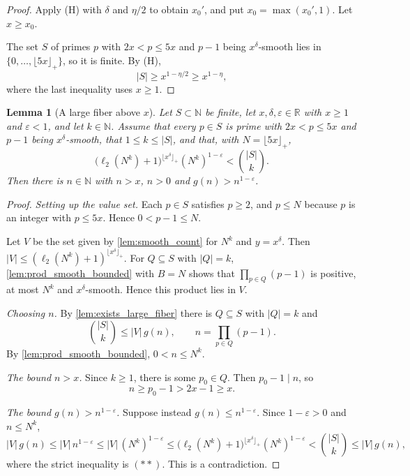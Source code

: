 \documentclass[11pt]{article}
\newtheorem{lemma}[theorem]{Lemma}
\theoremstyle{definition}
\theoremstyle{remark}
\newcommand{\floorp}[1]{\lfloor #1\rfloor_{+}}
\newcommand{\ltwo}{\ell_{2}}
\begin{document}
\begin{proof}
Apply (H) with $\delta$ and $\eta/2$ to obtain $x_0'$, and put $x_0=\max(x_0',1)$. Let $x\ge x_0$.

The set $S$ of primes $p$ with $2x<p\le5x$ and $p-1$ being $x^\delta$-smooth lies in $\{0,\dots,\floorp{5x}\}$, so it is finite. By (H),
\[
|S|\ge x^{1-\eta/2}\ge x^{1-\eta},
\]
where the last inequality uses $x\ge1$.
\end{proof}

\begin{lemma}[A large fiber above $x$]\label{lem:good_n_from_finset}
Let $S\subset\mathbb{N}$ be finite, let $x,\delta,\varepsilon\in\mathbb{R}$ with $x\ge1$ and $\varepsilon<1$, and let $k\in\mathbb{N}$. Assume that every $p\in S$ is prime with $2x<p\le5x$ and $p-1$ being $x^\delta$-smooth, that $1\le k\le|S|$, and that, with $N=\floorp{5x}$,
\[
\bigl(\ltwo(N^k)+1\bigr)^{\floorp{x^\delta}}(N^k)^{1-\varepsilon}<\binom{|S|}{k}. \tag{$\ast\ast$}
\]
Then there is $n\in\mathbb{N}$ with $n>x$, $n>0$ and $g(n)>n^{1-\varepsilon}$.
\end{lemma}

\begin{proof}
\emph{Setting up the value set.} Each $p\in S$ satisfies $p\ge2$, and $p\le N$ because $p$ is an integer with $p\le5x$. Hence $0<p-1\le N$.

Let $V$ be the set given by \cref{lem:smooth_count} for $N^k$ and $y=x^\delta$. Then $|V|\le(\ltwo(N^k)+1)^{\floorp{x^\delta}}$. For $Q\subseteq S$ with $|Q|=k$, \cref{lem:prod_smooth_bounded} with $B=N$ shows that $\prod_{p\in Q}(p-1)$ is positive, at most $N^k$ and $x^\delta$-smooth. Hence this product lies in $V$.

\emph{Choosing $n$.} By \cref{lem:exists_large_fiber} there is $Q\subseteq S$ with $|Q|=k$ and
\[
\binom{|S|}k\le|V|\,g(n),\qquad n=\prod_{p\in Q}(p-1).
\]
By \cref{lem:prod_smooth_bounded}, $0<n\le N^k$.

\emph{The bound $n>x$.} Since $k\ge1$, there is some $p_0\in Q$. Then $p_0-1\mid n$, so
\[
n\ge p_0-1>2x-1\ge x .
\]

\emph{The bound $g(n)>n^{1-\varepsilon}$.} Suppose instead $g(n)\le n^{1-\varepsilon}$. Since $1-\varepsilon>0$ and $n\le N^k$,
\[
|V|\,g(n)\le|V|\,n^{1-\varepsilon}\le|V|\,(N^k)^{1-\varepsilon}\le\bigl(\ltwo(N^k)+1\bigr)^{\floorp{x^\delta}}(N^k)^{1-\varepsilon}<\binom{|S|}k\le|V|\,g(n),
\]
where the strict inequality is $(\ast\ast)$. This is a contradiction.
\end{proof}
\end{document}
